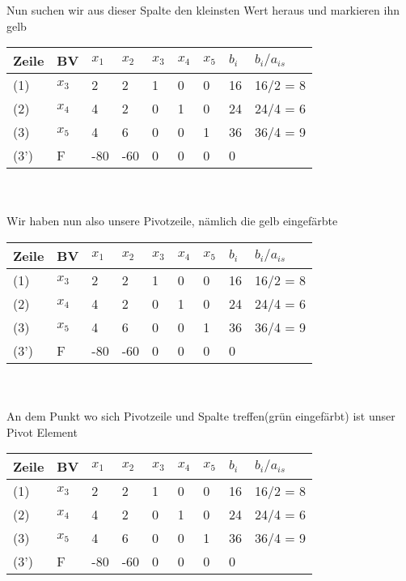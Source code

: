 \documentclass{article}
\begin{document}
Nun suchen wir aus dieser Spalte den kleinsten Wert heraus und markieren ihn gelb\\
\begin{tabular}{|l|l|l|l|l|l|l|l|l|}
	\hline
	Zeile & BV & $x_{1}$&$x_{2}$&$x_{3}$&$x_{4}$&$x_{5}$&$b_{i}$&$b_{i}/a_{is}$\\
	\hline
	(1)&$x_{3}$&\cellcolor{red}2&2&1&0&0&16&16/2 = 8\\
	\hline
	(2)&$x_{4}$&\cellcolor{red}4&2&0&1&0&24&\cellcolor{yellow}24/4 = 6\\
	\hline
	(3)&$x_{5}$&\cellcolor{red}4&6&0&0&1&36&36/4 = 9\\
	\hline
	(3')&F&\cellcolor{red}-80&-60&0&0&0&0&\\
	\hline
\end{tabular}\\\\
Wir haben nun also unsere Pivotzeile, nämlich die gelb eingefärbte\\
\begin{tabular}{|l|l|l|l|l|l|l|l|l|}
	\hline
	Zeile & BV & $x_{1}$&$x_{2}$&$x_{3}$&$x_{4}$&$x_{5}$&$b_{i}$&$b_{i}/a_{is}$\\
	\hline
	(1)&$x_{3}$&\cellcolor{red}2&2&1&0&0&16&16/2 = 8\\
	\hline
	(2)&\cellcolor{yellow}$x_{4}$&\cellcolor{yellow}4&\cellcolor{yellow}2&\cellcolor{yellow}0&\cellcolor{yellow}1&\cellcolor{yellow}0&\cellcolor{yellow}24&\cellcolor{yellow}24/4 = 6\\
	\hline
	(3)&$x_{5}$&\cellcolor{red}4&6&0&0&1&36&36/4 = 9\\
	\hline
	(3')&F&\cellcolor{red}-80&-60&0&0&0&0&\\
	\hline
\end{tabular}\\\\
An dem Punkt wo sich Pivotzeile und Spalte treffen(grün eingefärbt) ist unser Pivot Element\\
\begin{tabular}{|l|l|l|l|l|l|l|l|l|}
	\hline
	Zeile & BV & $x_{1}$&$x_{2}$&$x_{3}$&$x_{4}$&$x_{5}$&$b_{i}$&$b_{i}/a_{is}$\\
	\hline
	(1)&$x_{3}$&\cellcolor{red}2&2&1&0&0&16&16/2 = 8\\
	\hline
	(2)&\cellcolor{yellow}$x_{4}$&\cellcolor{green}4&\cellcolor{yellow}2&\cellcolor{yellow}0&\cellcolor{yellow}1&\cellcolor{yellow}0&\cellcolor{yellow}24&\cellcolor{yellow}24/4 = 6\\
	\hline
	(3)&$x_{5}$&\cellcolor{red}4&6&0&0&1&36&36/4 = 9\\
	\hline
	(3')&F&\cellcolor{red}-80&-60&0&0&0&0&\\
	\hline
\end{tabular}\\\\
\end{document}
